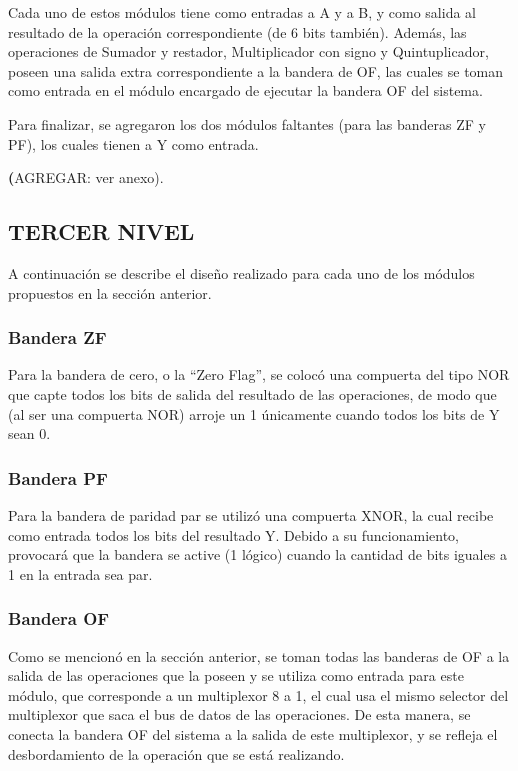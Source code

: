\documentclass[journal,trans]{IEEEtran}
\begin{document}
Cada uno de estos módulos tiene como entradas a A y a B, y como salida al resultado de la operación correspondiente (de 6 bits también). Además, las operaciones de Sumador y restador, Multiplicador con signo y Quintuplicador, poseen una salida extra correspondiente a la bandera de OF, las cuales se toman como entrada en el módulo encargado de ejecutar la bandera OF del sistema.

Para finalizar, se agregaron los dos módulos faltantes (para las banderas ZF y PF), los cuales tienen a Y como entrada.

\textbf(AGREGAR: ver anexo). 


\subsection{TERCER NIVEL}
A continuación se describe el diseño realizado para cada uno de los módulos propuestos en la sección anterior.

\subsubsection{Bandera ZF}
Para la bandera de cero, o la “Zero Flag”, se colocó una compuerta del tipo NOR que capte todos los bits de salida del resultado de las operaciones, de modo que (al ser una compuerta NOR) arroje un 1 únicamente cuando todos los bits de Y sean 0.

\subsubsection{Bandera PF}
Para la bandera de paridad par se utilizó una compuerta XNOR, la cual recibe como entrada todos los bits del resultado Y. Debido a su funcionamiento, provocará que la bandera se active (1 lógico) cuando la cantidad de bits iguales a 1 en la entrada sea par.

\subsubsection{Bandera OF}
Como se mencionó en la sección anterior, se toman todas las banderas de OF a la salida de las operaciones que la poseen y se utiliza como entrada para este módulo, que corresponde a un multiplexor 8 a 1, el cual usa el mismo selector del multiplexor que saca el bus de datos de las operaciones. De esta manera, se conecta la bandera OF del sistema a la salida de este multiplexor, y se refleja el desbordamiento de la operación que se está realizando. 
\end{document}
